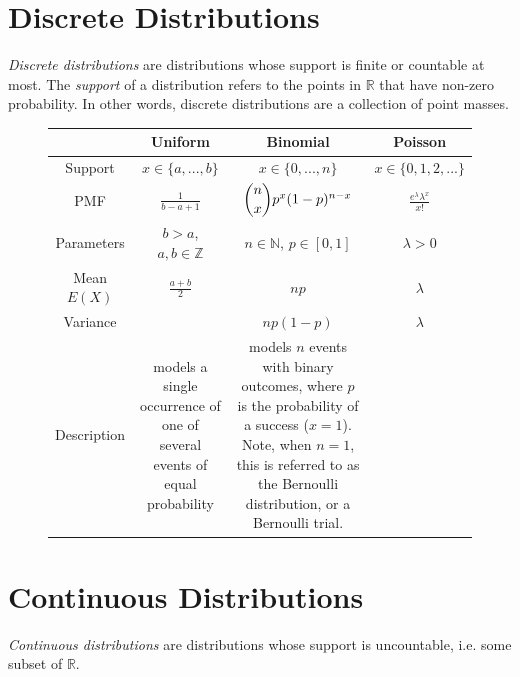 \label{lab:distributions}

\section*{Discrete Distributions}
\emph{Discrete distributions} are distributions whose support is finite or countable at most. 
The \emph{support} of a distribution refers to the points in $\mathbb{R}$ that have non-zero probability. 
In other words, discrete distributions are a collection of point masses. 

\begin{figure}[h]
\begin{center}
\begin{tabular}{|c|c|c|c|}
	\hline
 & Uniform &  Binomial & Poisson \\
\hline 
\hline
Support&$x \in \{a,...,b\}$&$x \in \{0,...,n\}$&$x \in \{0,1,2,...\}$\\ \hline
PMF&$\frac{1}{b-a+1}$&$\dbinom{n}{x}p^x(1-p)^{n-x}$&$\frac{e^\lambda \lambda^x}{x!}$\\ \hline
Parameters&$b>a$, $a,b \in \mathbb{Z}$&$n \in \mathbb{N}$, $p \in [0,1]$& $\lambda>0$\\ \hline
Mean $E(X)$&$\frac{a+b}{2}$&$np$& $\lambda$\\ \hline
Variance&&$np(1-p)$& $\lambda$\\ \hline
Description& 
\parbox{1in}{models a single occurrence of one of several events of equal probability} & \parbox{1in}{models $n$ events with binary outcomes, where $p$ is the probability of a success ($x=1$). Note, when $n=1$, this is referred to as the Bernoulli distribution, or a Bernoulli trial.}&\\
\hline
\end{tabular}
\end{center}
\end{figure}

\section*{Continuous Distributions}
\emph{Continuous distributions} are distributions whose support is uncountable, i.e. some subset of $\mathbb{R}$. 

